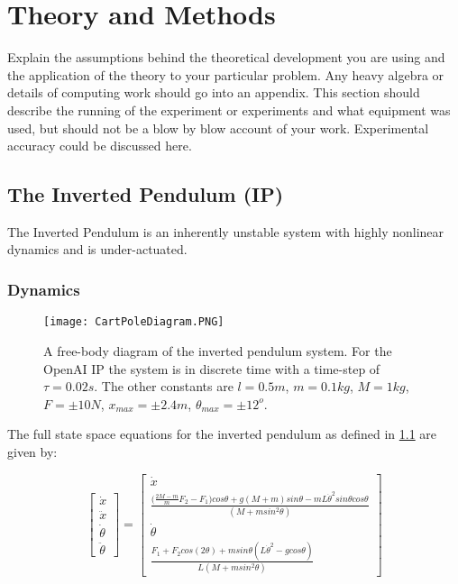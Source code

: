 \documentclass[../main.tex]{subfiles}
\begin{document}
\onlyinsubfile{\tableofcontents{}}

\chapter{Theory and Methods}

Explain the assumptions behind the theoretical development you are using and the application of the theory to your particular problem. Any heavy algebra or details of computing work should go into an appendix. This section should describe the running of the experiment or experiments and what equipment was used, but should not be a blow by blow account of your work. Experimental accuracy could be discussed here.

\section{The Inverted Pendulum (IP)}
The Inverted Pendulum is an inherently unstable system with highly nonlinear dynamics and is under-actuated.

\subsection{Dynamics}

\begin{figure}[ht]
    \centering
    \texttt{[image: CartPoleDiagram.PNG]}
    \caption{A free-body diagram of the inverted pendulum system. For the OpenAI IP the system is in discrete time with a time-step of $\tau =  0.02s$. The other constants are $l = 0.5m$, $m=0.1kg$, $M=1kg$, $F=\pm10N$, $x_{max}=\pm 2.4m$, $\theta_{max} = \pm 12^o$.}
    \label{fig:invpen}
\end{figure}

The full state space equations for the inverted pendulum as defined in \cref{fig:invpen} are given by:

\begin{equation}
\begin{bmatrix} \dot{x} \\ \ddot{x} \\ \dot{\theta} \\ \ddot{\theta} \end{bmatrix}  =
\begin{bmatrix} \dot{x} \\ \frac{\big(\frac{2M-m}{m}F_2-F_1\big)cos\theta + g(M+m)sin\theta - mL\dot{\theta}^2 sin\theta cos\theta}{(M + m sin^2\theta)} \\ \dot{\theta} \\ \frac{F_1 + F_2cos(2\theta)+ msin\theta(L\dot{\theta}^2-g cos\theta)}{L(M+m sin^2\theta)} \end{bmatrix} 
\end{equation}
\end{document}
